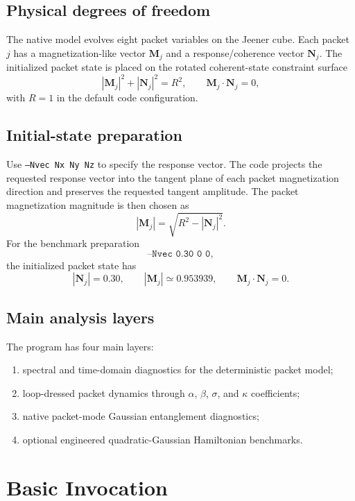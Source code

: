 \documentclass[11pt]{article}
\begin{document}
\subsection{Physical degrees of freedom}
The native model evolves eight packet variables on the Jeener cube. Each packet
\(j\) has a magnetization-like vector \(\mathbf M_j\) and a response/coherence
vector \(\mathbf N_j\). The initialized packet state is placed on the rotated
coherent-state constraint surface
\begin{equation}
|\mathbf M_j|^2 + |\mathbf N_j|^2 = R^2,
\qquad
\mathbf M_j \cdot \mathbf N_j = 0,
\end{equation}
with \(R=1\) in the default code configuration.

\subsection{Initial-state preparation}
Use \texttt{--Nvec Nx Ny Nz} to specify the response vector. The code projects the
requested response vector into the tangent plane of each packet magnetization
direction and preserves the requested tangent amplitude. The packet
magnetization magnitude is then chosen as
\begin{equation}
|\mathbf M_j| = \sqrt{R^2 - |\mathbf N_j|^2}.
\end{equation}
For the benchmark preparation
\[
\texttt{--Nvec 0.30 0 0},
\]
the initialized packet state has
\[
|\mathbf N_j| = 0.30,
\qquad
|\mathbf M_j| \simeq 0.953939,
\qquad
\mathbf M_j \cdot \mathbf N_j = 0.
\]

\subsection{Main analysis layers}
The program has four main layers:
\begin{enumerate}[label=\arabic*.]
\item spectral and time-domain diagnostics for the deterministic packet model;
\item loop-dressed packet dynamics through \(\alpha\), \(\beta\), \(\sigma\), and
\(\kappa\) coefficients;
\item native packet-mode Gaussian entanglement diagnostics;
\item optional engineered quadratic-Gaussian Hamiltonian benchmarks.
\end{enumerate}

\section{Basic Invocation}
\end{document}
